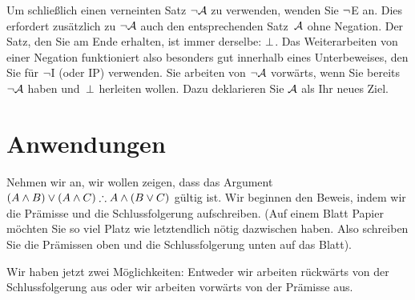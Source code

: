 Um schlie{\ss}lich einen verneinten Satz $\neg \mathcal{A}$ zu verwenden, wenden Sie $\neg$E an. Dies erfordert zusätzlich zu $\neg \mathcal{A}$ auch den entsprechenden Satz~$\mathcal{A}$ ohne Negation. Der Satz, den Sie am Ende erhalten, ist immer derselbe: $\bot$. Das Weiterarbeiten von einer Negation funktioniert also besonders gut innerhalb eines Unterbeweises, den Sie für $\neg$I (oder IP) verwenden. Sie arbeiten von $\neg \mathcal{A}$ vorwärts, wenn Sie bereits $\neg \mathcal{A}$ haben und~$\bot$ herleiten wollen. Dazu deklarieren Sie $\mathcal{A}$ als Ihr neues Ziel.
\begin{fitchproof}
	\ellipsesline 
\end{fitchproof}

\section{Anwendungen}

Nehmen wir an, wir wollen zeigen, dass das Argument $(A \eand B) \eor (A \eand C) \therefore A \eand (B \eor C)$ gültig ist. Wir beginnen den Beweis, indem wir die Prämisse und die Schlussfolgerung aufschreiben. (Auf einem Blatt Papier möchten Sie so viel Platz wie letztendlich nötig dazwischen haben. Also schreiben Sie die Prämissen oben und die Schlussfolgerung unten auf das Blatt).
\begin{fitchproof}
\ellipsesline
\end{fitchproof}
Wir haben jetzt zwei Möglichkeiten: Entweder wir arbeiten rückwärts von der Schlussfolgerung aus oder wir arbeiten vorwärts von der Prämisse aus. 

